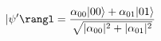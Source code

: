 \documentclass[preview]{standalone}
\begin{document}
\begin{align*}
|\psi'\rangl = \frac{\alpha_{00} |00\rangle + \alpha_{01}|01\rangle}{\sqrt{|\alpha_{00}|^2 + |\alpha_{01}|^2}}
\end{align*}
\end{document}
